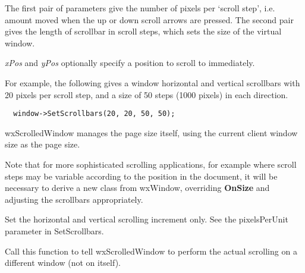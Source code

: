 





The first pair of parameters give the number of pixels per `scroll step', i.e. amount
moved when the up or down scroll arrows are pressed.
The second pair gives the length of scrollbar in scroll steps, which sets the size of the virtual
window.

{\it xPos} and {\it yPos} optionally specify a position to scroll to immediately.

For example, the following gives a window horizontal and vertical
scrollbars with 20 pixels per scroll step, and a size of 50 steps (1000
pixels) in each direction.

\begin{verbatim}
  window->SetScrollbars(20, 20, 50, 50);
\end{verbatim}

wxScrolledWindow manages the page size itself,
using the current client window size as the page size.

Note that for more sophisticated scrolling applications, for example where
scroll steps may be variable according to the position in the document, it will be
necessary to derive a new class from wxWindow, overriding {\bf OnSize} and
adjusting the scrollbars appropriately.



\label{wxscrolledwindowsetscrollrate}


Set the horizontal and vertical scrolling increment only.  See the pixelsPerUnit
parameter in SetScrollbars.

\label{wxscrolledwindowsettargetwindow}


Call this function to tell wxScrolledWindow to perform the actual scrolling on
a different window (not on itself).

